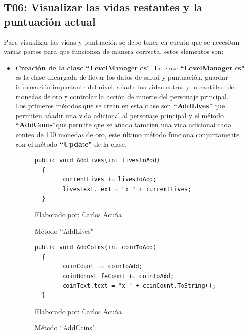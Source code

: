 \documentclass[a4paper, openright, 12pt]{report}
\begin{document}
\subsection*{T06: Visualizar las vidas restantes y la puntuación actual}
\justify
Para visualizar las vidas y puntuación se debe tener en cuenta que se necesitan varias partes para que funcionen de manera correcta, estos elementos son:
\begin{itemize}
\item \textbf{Creación de la clase ``LevelManager.cs".} La clase \textbf{``LevelManager.cs"} es la clase encargada de llevar los datos de salud y puntuación, guardar información importante del nivel, añadir las vidas extras y la cantidad de monedas de oro y controlar la acción de muerte del personaje principal.\\
Los primeros métodos que se crean en esta clase son \textbf{``AddLives"} que permiten añadir una vida adicional al personaje principal y el método \textbf{``AddCoins"}que permite que se añada también una vida adicional cada conteo de 100 monedas de oro, este último método funciona conjuntamente con el método \textbf{``Update"} de la clase.

\begin{figure}[h]
\captionsetup{justification=centering,margin=2cm}
\centering
\lstset{language=C, breaklines=true, basicstyle=\footnotesize}
\lstset{numbers=left, numberstyle=\tiny, stepnumber=1, numbersep=-2pt}
\begin{lstlisting}[frame=single]
  public void AddLives(int livesToAdd)
  {
        currentLives += livesToAdd;
        livesText.text = "x " + currentLives;
  }
\end{lstlisting}
\caption{Método ``AddLives"}
Elaborado por: Carlos Acuña
\end{figure}

\begin{figure}[h]
\captionsetup{justification=centering,margin=2cm}
\centering
\lstset{language=C, breaklines=true, basicstyle=\footnotesize}
\lstset{numbers=left, numberstyle=\tiny, stepnumber=1, numbersep=-2pt}
\begin{lstlisting}[frame=single]
  public void AddCoins(int coinToAdd)
  {
        coinCount += coinToAdd;
        coinBonusLifeCount += coinToAdd;
        coinText.text = "x " + coinCount.ToString();
  }
\end{lstlisting}
\caption{Método ``AddCoins"}
Elaborado por: Carlos Acuña
\end{figure}


\end{itemize}
\end{document}
